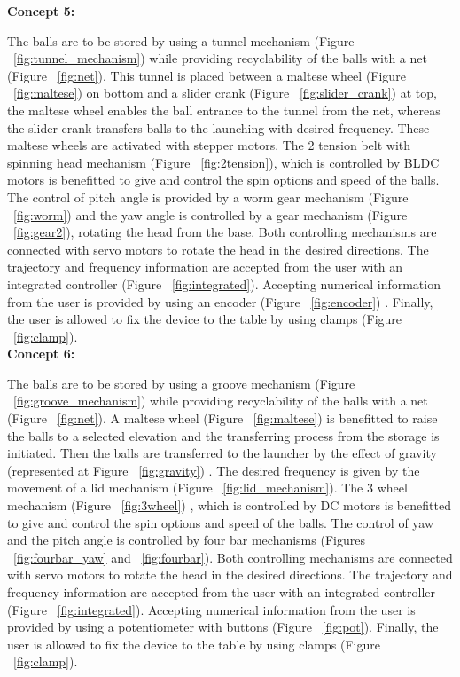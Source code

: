 \documentclass[12pt]{report}
\begin{document}
    \textbf{Concept 5:}

    The balls are to be stored by using a tunnel mechanism (Figure ~\ref{fig:tunnel_mechanism}) while providing recyclability of the balls with a net (Figure ~\ref{fig:net}). This tunnel is placed between a maltese wheel (Figure ~\ref{fig:maltese}) on bottom and a slider crank (Figure ~\ref{fig:slider_crank}) at top, the maltese wheel enables the ball entrance to the tunnel from the net, whereas the slider crank transfers balls to the launching with desired frequency. These maltese wheels are activated with stepper motors. The 2 tension belt with spinning head mechanism (Figure ~\ref{fig:2tension}), which is controlled by BLDC motors is benefitted to give and control the spin options and speed of the balls. The control of pitch angle is provided by a worm gear mechanism (Figure ~\ref{fig:worm}) and the yaw angle is controlled by a gear mechanism (Figure ~\ref{fig:gear2}), rotating the head from the base. Both controlling mechanisms are connected with servo motors to rotate the head in the desired directions. The trajectory and frequency information are accepted from the user with an integrated controller (Figure ~\ref{fig:integrated}). Accepting numerical information from the user is provided by using an encoder (Figure ~\ref{fig:encoder}) . Finally, the user is allowed to fix the device to the table by using clamps (Figure ~\ref{fig:clamp}). \\

    \textbf{Concept 6:}

    The balls are to be stored by using a groove mechanism (Figure ~\ref{fig:groove_mechanism}) while providing recyclability of the balls with a net (Figure ~\ref{fig:net}). A maltese wheel (Figure ~\ref{fig:maltese}) is benefitted to raise the balls to a selected elevation and the transferring process from the storage is initiated. Then the balls are transferred to the launcher by the effect of gravity (represented at Figure ~\ref{fig:gravity}) . The desired frequency is given by the movement of a lid mechanism (Figure ~\ref{fig:lid_mechanism}). The 3 wheel mechanism (Figure ~\ref{fig:3wheel}) , which is controlled by DC motors is benefitted to give and control the spin options and speed of the balls. The control of yaw and the pitch angle is controlled by four bar mechanisms (Figures ~\ref{fig:fourbar_yaw} and ~\ref{fig:fourbar}). Both controlling mechanisms are connected with servo motors to rotate the head in the desired directions. The trajectory and frequency information are accepted from the user with an integrated controller (Figure ~\ref{fig:integrated}). Accepting numerical information from the user is provided by using a potentiometer with buttons (Figure ~\ref{fig:pot}). Finally, the user is allowed to fix the device to the table by using clamps (Figure ~\ref{fig:clamp}). \\
\end{document}
